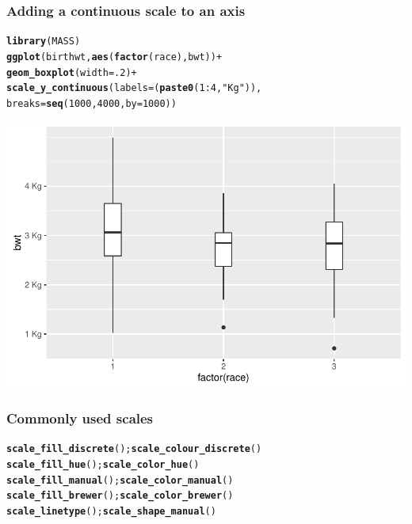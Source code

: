 \documentclass{beamer}\usepackage[]{graphicx}\usepackage[]{color}
\makeatletter
\newcommand{\hlnum}[1]{\textcolor[rgb]{0.686,0.059,0.569}{#1}}%
\newcommand{\hlstr}[1]{\textcolor[rgb]{0.192,0.494,0.8}{#1}}%
\newcommand{\hlopt}[1]{\textcolor[rgb]{0,0,0}{#1}}%
\newcommand{\hlstd}[1]{\textcolor[rgb]{0.345,0.345,0.345}{#1}}%
\newcommand{\hlkwc}[1]{\textcolor[rgb]{0.333,0.667,0.333}{#1}}%
\newcommand{\hlkwd}[1]{\textcolor[rgb]{0.737,0.353,0.396}{\textbf{#1}}}%
\newenvironment{kframe}{%
 \def\at@end@of@kframe{}%
 \ifinner\ifhmode%
  \def\at@end@of@kframe{\end{minipage}}%
  \begin{minipage}{\columnwidth}%
 \fi\fi%
 \def\FrameCommand##1{\hskip\@totalleftmargin \hskip-\fboxsep
 \colorbox{shadecolor}{##1}\hskip-\fboxsep
     \hskip-\linewidth \hskip-\@totalleftmargin \hskip\columnwidth}%
 \MakeFramed {\advance\hsize-\width
   \@totalleftmargin\z@ \linewidth\hsize
   \@setminipage}}%
 {\par\unskip\endMakeFramed%
 \at@end@of@kframe}
\newenvironment{knitrout}{}{} %
\makeatother
\begin{document}

\begin{frame}[fragile]
\frametitle{Adding a continuous scale to an axis}
\begin{knitrout}\footnotesize
{}\color{fgcolor}\begin{kframe}
\begin{alltt}
\hlkwd{library}\hlstd{(MASS)}
\hlkwd{ggplot}\hlstd{(birthwt,} \hlkwd{aes}\hlstd{(}\hlkwd{factor}\hlstd{(race), bwt))} \hlopt{+}
    \hlkwd{geom_boxplot}\hlstd{(}\hlkwc{width} \hlstd{=} \hlnum{.2}\hlstd{)} \hlopt{+}
    \hlkwd{scale_y_continuous}\hlstd{(}\hlkwc{labels} \hlstd{= (}\hlkwd{paste0}\hlstd{(}\hlnum{1}\hlopt{:}\hlnum{4}\hlstd{,} \hlstr{" Kg"}\hlstd{)),}
        \hlkwc{breaks} \hlstd{=} \hlkwd{seq}\hlstd{(}\hlnum{1000}\hlstd{,} \hlnum{4000}\hlstd{,} \hlkwc{by} \hlstd{=} \hlnum{1000}\hlstd{))}
\end{alltt}
\end{kframe}

{\centering \includegraphics[width=.75\linewidth]{figure/boxplots3-1} 

}



\end{knitrout}
\end{frame}


\begin{frame}[fragile]
\frametitle{Commonly used scales}
\begin{knitrout}\footnotesize
{}\color{fgcolor}\begin{kframe}
\begin{alltt}
\hlkwd{scale_fill_discrete}\hlstd{();} \hlkwd{scale_colour_discrete}\hlstd{()}
\hlkwd{scale_fill_hue}\hlstd{();} \hlkwd{scale_color_hue}\hlstd{()}
\hlkwd{scale_fill_manual}\hlstd{();}  \hlkwd{scale_color_manual}\hlstd{()}
\hlkwd{scale_fill_brewer}\hlstd{();} \hlkwd{scale_color_brewer}\hlstd{()}
\hlkwd{scale_linetype}\hlstd{();} \hlkwd{scale_shape_manual}\hlstd{()}
\end{alltt}
\end{kframe}
\end{knitrout}
\end{frame}
\end{document}

